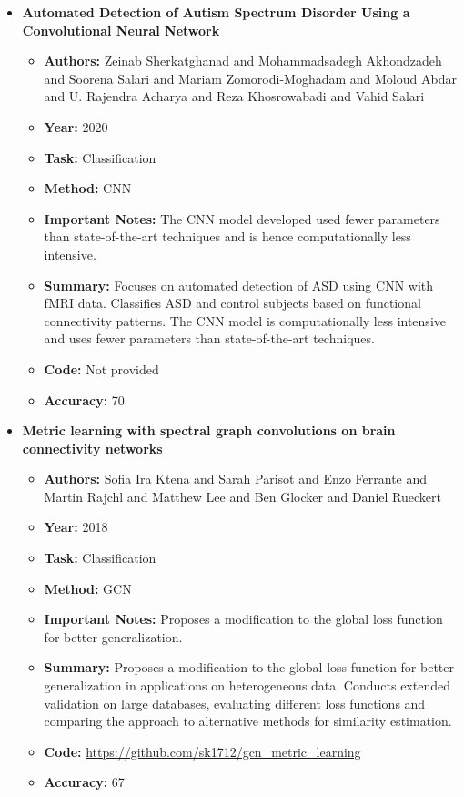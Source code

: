 \documentclass{article}
\begin{document}
\begin{itemize}[left=0pt]
  \item \textbf{Automated Detection of Autism Spectrum Disorder Using a Convolutional Neural Network}
  \begin{itemize}
    \item \textbf{Authors:} Zeinab Sherkatghanad and Mohammadsadegh Akhondzadeh and Soorena Salari and Mariam Zomorodi-Moghadam and Moloud Abdar and U. Rajendra Acharya and Reza Khosrowabadi and Vahid Salari
    \item \textbf{Year:} 2020
    \item \textbf{Task:} Classification
    \item \textbf{Method:} CNN
    \item \textbf{Important Notes:} The CNN model developed used fewer parameters than state-of-the-art techniques and is hence computationally less intensive.
    \item \textbf{Summary:} Focuses on automated detection of ASD using CNN with fMRI data. Classifies ASD and control subjects based on functional connectivity patterns. The CNN model is computationally less intensive and uses fewer parameters than state-of-the-art techniques.
    \item \textbf{Code:} Not provided
    \item \textbf{Accuracy:} 70
  \end{itemize}

  \item \textbf{Metric learning with spectral graph convolutions on brain connectivity networks}
  \begin{itemize}
    \item \textbf{Authors:} Sofia Ira Ktena and Sarah Parisot and Enzo Ferrante and Martin Rajchl and Matthew Lee and Ben Glocker and Daniel Rueckert
    \item \textbf{Year:} 2018
    \item \textbf{Task:} Classification
    \item \textbf{Method:} GCN
    \item \textbf{Important Notes:} Proposes a modification to the global loss function for better generalization.
    \item \textbf{Summary:} Proposes a modification to the global loss function for better generalization in applications on heterogeneous data. Conducts extended validation on large databases, evaluating different loss functions and comparing the approach to alternative methods for similarity estimation.
    \item \textbf{Code:} \url{https://github.com/sk1712/gcn_metric_learning}
    \item \textbf{Accuracy:} 67
  \end{itemize}


\end{itemize}
\end{document}
